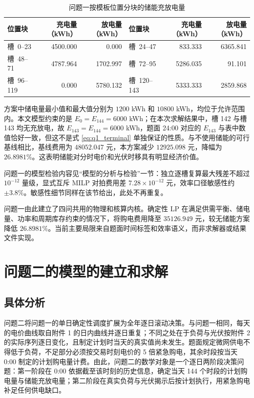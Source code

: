 \documentclass[withoutpreface,bwprint]{cumcmthesis}
\begin{document}
\begin{table}[htbp]
	\centering
	\caption{问题一按模板位置分块的储能充放电量}
	\begin{tabularx}{\textwidth}{@{}LrrLrr@{}}
		\toprule
		位置块 & 充电量（kWh） & 放电量（kWh） & 位置块 & 充电量（kWh） & 放电量（kWh） \\
		\midrule
		槽~0--23 & 4500.000 & 0.000 & 槽~24--47 & 833.333 & 6365.841 \\
		槽~48--71 & 4787.964 & 1702.997 & 槽~72--95 & 5286.035 & 91.101 \\
		槽~96--119 & 0.000 & 5780.132 & 槽~120--143 & 5333.333 & 2859.868 \\
		\bottomrule
	\end{tabularx}
	\label{tab:q1_cd}
\end{table}

方案中储电量最小值和最大值分别为 $1200$ kWh 和 $10800$ kWh，均位于允许范围内。本文模型约束的是 $E_0=E_{144}=6000$ kWh；在本次求解结果中，槽 142 与槽 143 均无充放电，故 $E_{143}=E_{144}=6000$ kWh，题面 24:00 对应的 $E_{143}$ 与表中数值恰好一致，但这不是式 \eqref{eq:q1_terminal} 单独保证的性质。与不使用储能的可行基线相比，基线费用为 $48052.047$ 元，本方案减少 $12925.098$ 元，降幅为 $26.8981\%$。这表明储能对分时电价和光伏时移具有明显经济价值。

问题一的模型检验内容见“模型的分析与检验”一节：独立逐槽复算最大残差不超过 $10^{-12}$ 量级，显式互斥 MILP 对拍费用差 $7.28\times10^{-12}$ 元，效率口径敏感性约 $\pm3.8\%$。敏感性细节同样在该节给出，此处不再重复。

问题一由此建立了四问共用的物理和核算内核。确定性 LP 在满足供需平衡、储电量、功率和周期库存约束的情况下，将购电费用降至 $35126.949$ 元，较无储能方案降低 $26.8981\%$。当前主要局限来自题面时间标签和效率语义，而非求解器或结果文件实现。

\section{问题二的模型的建立和求解}
\subsection{具体分析}

问题二将问题一的单日确定性调度扩展为全年逐日滚动决策。与问题一相同，每天的电价曲线取自附件 1 的日内曲线并逐日重复；不同之处在于负荷与光伏按附件 2 的实际序列逐日变化，且制定计划时当天的真实值尚未发生。题面规定微网供电不得低于负荷，不足部分必须按交易时刻电价的 5 倍紧急购电，其余时段按当天 0:00 制定的计划购电量计费。由此，问题二的数学对象是一个逐日两阶段决策问题：第一阶段在 0:00 依据截至该时刻的历史信息，确定当天 144 个时段的计划购电量与储能充放电量；第二阶段在真实负荷与光伏揭示后按计划执行，用紧急购电补足任何供电缺口。
\end{document}
